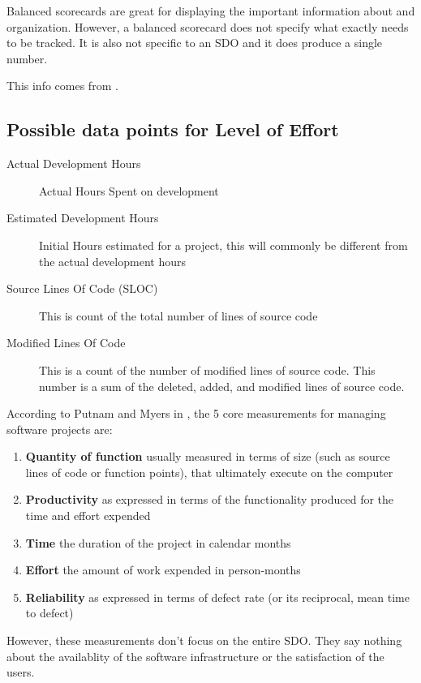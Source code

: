 \documentclass[SDSUThesis.tex]{subfiles}
\begin{document}
Balanced scorecards are great for displaying the important information about
and organization.  However, a balanced scorecard does not specify what
exactly needs to be tracked.  It is also not specific to an SDO and 
it does produce a single number.

This info comes from \cite{parmenter2010}.

\subsection{Possible data points for Level of Effort}

\begin{description}
    \item[Actual Development Hours] Actual Hours Spent on development
    \item[Estimated Development Hours]  Initial Hours estimated for a project, this will commonly be different from the actual development hours
    \item[Source Lines Of Code (SLOC)]  This is count of the total number of lines of source code
    \item[Modified Lines Of Code] This is a count of the number of modified lines of source code. This number is a sum of the deleted, added, and modified lines of source code.
\end{description}

According to Putnam and Myers in \cite{Putnam2013}, the 5 core measurements for managing software
projects are:

\begin{enumerate}
    \item \textbf{Quantity of function} usually measured in terms of size (such as source lines of code or function points), that ultimately execute on the computer
    \item \textbf{Productivity} as expressed in terms of the functionality produced for the time and effort expended
    \item \textbf{Time} the duration of the project in calendar months
    \item \textbf{Effort} the amount of work expended in person-months
    \item \textbf{Reliability} as expressed in terms of defect rate (or its reciprocal, mean time to defect)
\end{enumerate}
However, these measurements don't focus on the entire SDO. They say nothing about the availablity of the software infrastructure or the satisfaction of the users.
\end{document}
